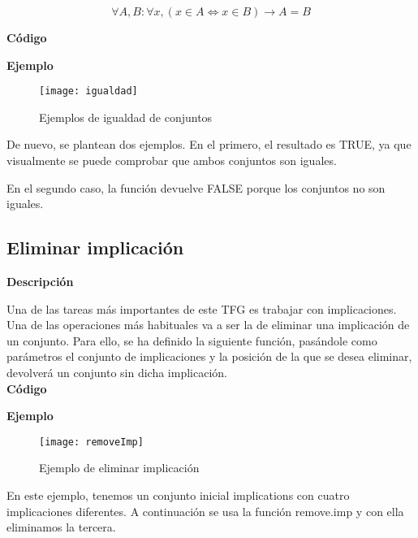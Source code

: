    \[
        \forall A, B : \forall x, (x \in A \Leftrightarrow x \in B) \to A = B
    \]


    \textbf{C\'odigo}

    
    \bigskip

    \textbf{Ejemplo}

    \begin{figure}[H]
        \centering
        \texttt{[image: igualdad]}
        \caption{Ejemplos de igualdad de conjuntos}
        \label{fig:igualdad}
    \end{figure}

    De nuevo, se plantean dos ejemplos. En el primero, el resultado es TRUE, ya que visualmente se puede comprobar que ambos conjuntos son 
    iguales.

    En el segundo caso, la funci\'on devuelve FALSE porque los conjuntos no son iguales.






\subsection{Eliminar implicaci\'on}

    \textbf{Descripci\'on}

    Una de las tareas m\'as importantes de este TFG es trabajar con implicaciones. Una de las operaciones m\'as habituales 
    va a ser la de eliminar una implicaci\'on de un conjunto. Para ello, se ha definido la siguiente funci\'on, pas\'andole 
    como par\'ametros el conjunto de implicaciones y la posici\'on de la que se desea eliminar, devolver\'a un conjunto sin 
    dicha implicaci\'on.
    \\


    \textbf{C\'odigo}

    
    \bigskip

    \textbf{Ejemplo}

    \begin{figure}[H]
        \centering
        \texttt{[image: removeImp]}
        \caption{Ejemplo de eliminar implicaci\'on}
        \label{fig:removeImp}
    \end{figure}

    En este ejemplo, tenemos un conjunto inicial implications con cuatro implicaciones diferentes. A continuaci\'on se usa la 
    funci\'on remove.imp y con ella eliminamos la tercera.

